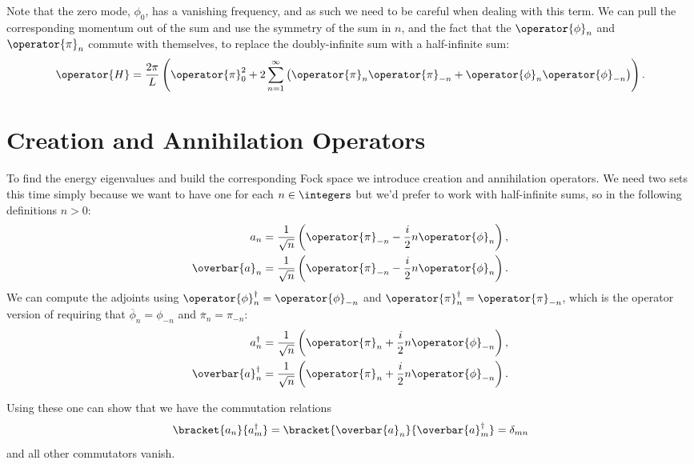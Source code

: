 \documentclass[fleqn]{NotesClass}
\newcommand{\hermit}{{\dagger}}
\begin{document}
    Note that the zero mode, \(\phi_0\), has a vanishing frequency, and as such we need to be careful when dealing with this term.
    We can pull the corresponding momentum out of the sum and use the symmetry of the sum in \(n\), and the fact that the \(\operator{\phi}_n\) and \(\operator{\pi}_n\) commute with themselves, to replace the doubly-infinite sum with a half-infinite sum:
    \begin{equation}
        \operator{H} = \frac{2\pi}{L}\left( \operator{\pi}_0^2 + 2 \sum_{n=1}^{\infty} \left( \operator{\pi}_n\operator{\pi}_{-n} + \operator{\phi}_n\operator{\phi}_{-n} \right) \right).
    \end{equation}
    
    \section{Creation and Annihilation Operators}
    To find the energy eigenvalues and build the corresponding Fock space we introduce creation and annihilation operators.
    We need two sets this time simply because we want to have one for each \(n \in \integers\) but we'd prefer to work with half-infinite sums, so in the following definitions \(n > 0\):
    \begin{align}
        \label{eqn:creation operators}
        a_n &= \frac{1}{\sqrt{n}}\left( \operator{\pi}_{-n} - \frac{i}{2}n \operator{\phi}_n \right),\\
        \overbar{a}_n &= \frac{1}{\sqrt{n}}\left( \operator{\pi}_{-n} - \frac{i}{2}n \operator{\phi}_n \right).
    \end{align}
    We can compute the adjoints using \(\operator{\phi}_n^{\hermit} = \operator{\phi}_{-n}\) and \(\operator{\pi}_n^{\hermit} = \operator{\pi}_{-n}\), which is the operator version of requiring that \(\overbar{\phi}_n = \phi_{-n}\) and \(\overbar{\pi}_n = \pi_{-n}\):
    \begin{align}
        \label{eqn:annihilation operators}
        a_n^{\hermit} &= \frac{1}{\sqrt{n}}\left( \operator{\pi}_{n} + \frac{i}{2}n \operator{\phi}_{-n} \right),\\
        \overbar{a}_n^{\hermit} &= \frac{1}{\sqrt{n}}\left( \operator{\pi}_{n} + \frac{i}{2}n \operator{\phi}_{-n} \right).
    \end{align}
    
    Using these one can show that we have the commutation relations
    \begin{equation}
        \bracket{a_n}{a_m^\hermit} = \bracket{\overbar{a}_n}{\overbar{a}_m^{\hermit}} = \delta_{mn}
    \end{equation}
    and all other commutators vanish.
    
\end{document}
